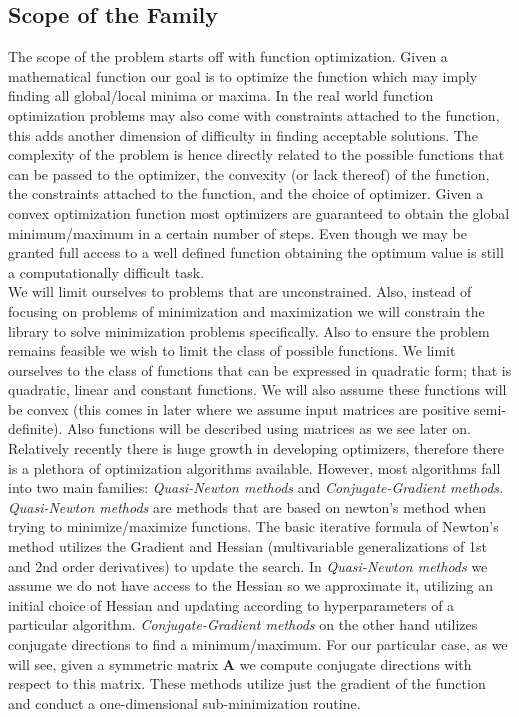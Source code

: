 \documentclass[12pt]{article}
\begin{document}
\subsection{Scope of the Family} 
The scope of the problem starts off with function optimization. Given a mathematical function our goal is to optimize the function which may imply finding all global/local minima or maxima. In the real world function optimization problems may also come with constraints attached to the function, this adds another dimension of difficulty in finding acceptable solutions. The complexity of the problem is hence directly related to the possible functions that can be passed to the optimizer, the convexity (or lack thereof) of the function, the constraints attached to the function, and the choice of optimizer. Given a convex optimization function most optimizers are guaranteed to obtain the global minimum/maximum in a certain number of steps. Even though we may be granted full access to a well defined function obtaining the optimum value is still a computationally difficult task.
\\

We will limit ourselves to problems that are unconstrained. Also, instead of focusing on problems of minimization and maximization we will constrain the library to solve minimization problems specifically. Also to ensure the problem remains feasible we wish to limit the class of possible functions. We limit ourselves to the class of functions that can be expressed in quadratic form; that is quadratic, linear and constant functions. We will also assume these functions will be convex (this comes in later where we assume input matrices are positive semi-definite). Also functions will be described using matrices as we see later on. 
\\

Relatively recently there is huge growth in developing optimizers, therefore there is a plethora of optimization algorithms available. However, most algorithms fall into two main families: \textit{Quasi-Newton methods} and \textit{Conjugate-Gradient methods.} \textit{Quasi-Newton methods} are methods that are based on newton's method when trying to minimize/maximize functions. The basic iterative formula of Newton's method utilizes the Gradient and Hessian (multivariable generalizations of 1st and 2nd order derivatives) to update the search. In \textit{Quasi-Newton methods} we assume we do not have access to the Hessian so we approximate it, utilizing an initial choice of Hessian and updating according to hyperparameters of a particular algorithm. \textit{Conjugate-Gradient methods} on the other hand utilizes conjugate directions to find a minimum/maximum. For our particular case, as we will see, given a symmetric matrix $\mathbf{A}$ we compute conjugate directions with respect to this matrix. These methods utilize just the gradient of the function and conduct a one-dimensional sub-minimization routine. 
\\
\end{document}
